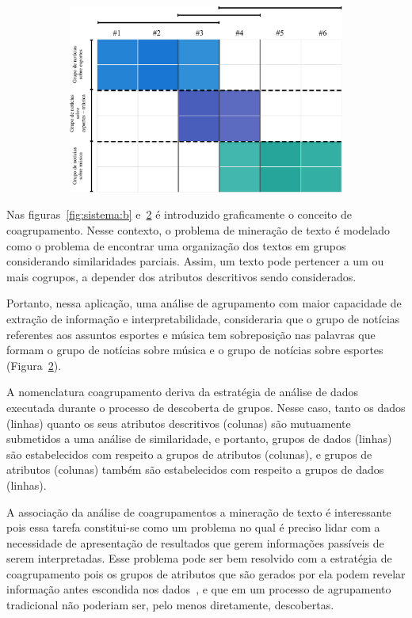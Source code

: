\documentclass[
    12pt,                %
    oneside,            %
    a4paper,            %
    english,            %
    brazil                %
    ]{abntex2ppgsi}
\begin{document}
\begin{figure} [htpb]
\begin{subfigure}[b]{0.45\textwidth}
        \includegraphics[width=\textwidth]{img/sistema2.png}
        \caption{}
        \label{fig:sistema:c}
    \end{subfigure}
\end{figure}

Nas figuras~\ref{fig:sistema:b} e~\ref{fig:sistema:c} é introduzido graficamente o conceito de coagrupamento.
Nesse contexto, o problema de mineração de texto é modelado como o problema de encontrar uma organização dos textos em grupos considerando similaridades parciais.
Assim, um texto pode pertencer a um ou mais cogrupos, a depender dos atributos descritivos sendo considerados.

Portanto, nessa aplicação, uma análise de agrupamento com maior capacidade de extração de informação e interpretabilidade, consideraria que o grupo de notícias referentes aos assuntos esportes e música tem sobreposição nas palavras que formam o grupo de notícias sobre música e o grupo de notícias sobre esportes (Figura~\ref{fig:sistema:c}).

A nomenclatura coagrupamento deriva da estratégia de análise de dados executada durante o processo de descoberta de grupos.
Nesse caso, tanto os dados (linhas) quanto os seus atributos descritivos (colunas) são mutuamente submetidos a uma análise de similaridade, e portanto, grupos de dados (linhas) são estabelecidos com respeito a grupos de atributos (colunas), e grupos de atributos (colunas) também são estabelecidos com respeito a grupos de dados (linhas).

A associação da análise de coagrupamentos a mineração de texto é interessante pois essa tarefa constitui-se como um problema no qual é preciso lidar com a necessidade de apresentação de resultados que gerem informações passíveis de serem interpretadas.
Esse problema pode ser bem resolvido com a estratégia de coagrupamento pois os grupos de atributos que são gerados por ela podem revelar informação antes escondida nos dados~\cite{Tjhi2009}, e que em um processo de agrupamento tradicional não poderiam ser, pelo menos diretamente, descobertas.
\end{document}
